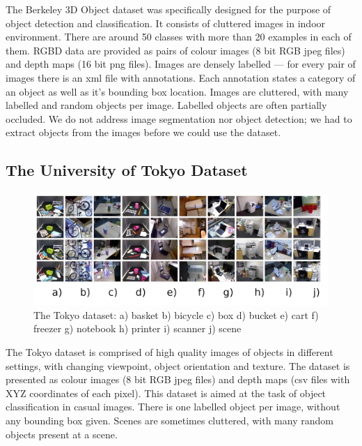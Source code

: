 	The Berkeley 3D Object dataset was specifically designed for the purpose of object detection and classification. It consists of cluttered images in indoor environment. There are around 50 classes with more than 20 examples in each of them. RGBD data are provided as pairs of colour images (8 bit RGB jpeg files) and depth maps (16 bit png files). Images are densely labelled --- for every pair of images there is an xml file with annotations. Each annotation states a category of an object as well as it's bounding box location. Images are cluttered, with many labelled and random objects per image. Labelled objects are often partially occluded. We do not address image segmentation nor object detection; we had to extract objects from the images before we could use the dataset.

	\subsection{The University of Tokyo Dataset}	
	\begin{figure}[!ht]
	\centering
	\includegraphics[width=1\textwidth]{figs/tokyo_horizontal}
	\caption{The Tokyo dataset: a) basket b) bicycle c) box d) bucket e) cart f) freezer g) notebook h) printer i) scanner j) scene}
	\label{fig:tokyo}
	\end{figure}
	
	The Tokyo dataset is comprised of high quality images of objects in different settings, with changing viewpoint, object orientation and texture. The dataset is presented as colour images (8 bit RGB jpeg files) and depth maps (csv files with XYZ coordinates of each pixel).	This dataset is aimed at the task of object classification in casual images. There is one labelled object per image, without any bounding box given. Scenes are sometimes cluttered, with many random objects present at a scene.